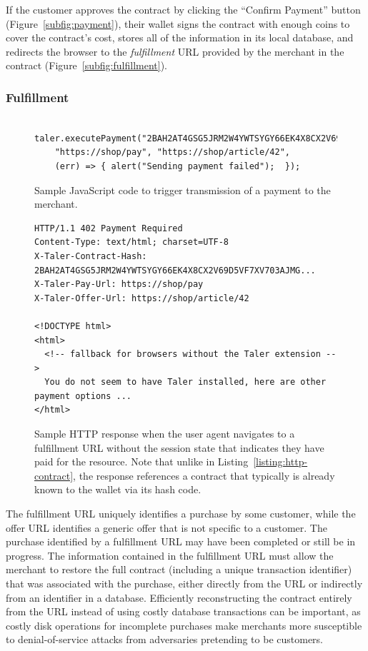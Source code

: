 \documentclass{llncs}
\begin{document}
If the customer approves the contract by clicking the ``Confirm
Payment'' button (Figure~\ref{subfig:payment}), their wallet signs the
contract with enough coins to cover the contract's cost, stores all of
the information in its local database, and redirects the browser to
the {\em fulfillment} URL provided by the merchant in the contract
(Figure~\ref{subfig:fulfillment}).

\subsubsection{Fulfillment}

\begin{figure}[t!]
  \lstset{language=HTML5}
\begin{lstlisting}
  taler.executePayment("2BAH2AT4GSG5JRM2W4YWTSYGY66EK4X8CX2V69D5VF7XV703AJMG",
    "https://shop/pay", "https://shop/article/42",
    (err) => { alert("Sending payment failed");  });
\end{lstlisting}
\caption{Sample JavaScript code to trigger transmission of a payment to the merchant.}
  \label{listing:javascript-execute}
\end{figure}


\begin{figure}[t!]
\begin{lstlisting}
HTTP/1.1 402 Payment Required
Content-Type: text/html; charset=UTF-8
X-Taler-Contract-Hash: 2BAH2AT4GSG5JRM2W4YWTSYGY66EK4X8CX2V69D5VF7XV703AJMG...
X-Taler-Pay-Url: https://shop/pay
X-Taler-Offer-Url: https://shop/article/42

<!DOCTYPE html>
<html>
  <!-- fallback for browsers without the Taler extension -->
  You do not seem to have Taler installed, here are other payment options ...
</html>
\end{lstlisting}
\caption{Sample HTTP response when the user agent navigates to a fulfillment
  URL without the session state that indicates they have paid for the resource.
  Note that unlike in Listing~\ref{listing:http-contract}, the response
  references a contract that typically is already known to the wallet via its
  hash code.}
  \label{listing:http-execute}
\end{figure}

The fulfillment URL uniquely identifies a purchase by some customer,
while the offer URL identifies a generic offer that is not specific to
a customer.  The purchase identified by a fulfillment URL may have
been completed or still be in progress.  The information contained in
the fulfillment URL must allow the merchant to restore the full
contract (including a unique transaction identifier) that was
associated with the purchase, either directly from the URL or
indirectly from an identifier in a database.  Efficiently
reconstructing the contract entirely from the URL instead of using
costly database transactions can be important, as costly disk
operations for incomplete purchases make merchants more susceptible to
denial-of-service attacks from adversaries pretending to be customers.
\end{document}
